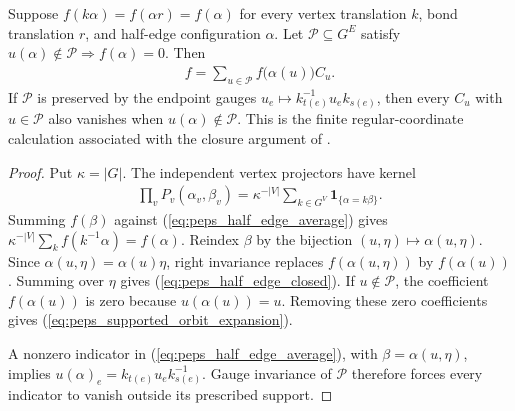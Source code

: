 \begin{lemma}%
    \label{thm:peps_regular_invariant_state_span}
    \leanok
    Suppose $f(k\alpha)=f(\alpha r)=f(\alpha)$ for every vertex
    translation $k$, bond translation $r$, and half-edge configuration
    $\alpha$. Let $\mathcal P\subseteq G^E$ satisfy
    $u(\alpha)\notin\mathcal P\Rightarrow f(\alpha)=0$. Then
    \begin{align}
        f=\sum_{u\in\mathcal P} f\bigl(\alpha(u)\bigr)C_u.
        \label{eq:peps_supported_orbit_expansion}
    \end{align}
    If $\mathcal P$ is preserved by the endpoint gauges
    $u_e\mapsto k_{t(e)}^{-1}u_ek_{s(e)}$, then every $C_u$ with
    $u\in\mathcal P$ also vanishes when $u(\alpha)\notin\mathcal P$.
    This is the finite regular-coordinate calculation associated with
    the closure argument of \cite[Theorem~5.5]{Schuch2010PEPS}.
\end{lemma}

\begin{proof}\leanok
    Put $\kappa=|G|$. The independent vertex projectors have kernel
    \begin{align}
        \prod_vP_v(\alpha_v,\beta_v)
        =\kappa^{-|V|}\sum_{k\in G^V}
        \mathbf1_{\{\alpha=k\beta\}}.
        \label{eq:peps_half_edge_average}
    \end{align}
    Summing $f(\beta)$ against (\ref{eq:peps_half_edge_average}) gives
    $\kappa^{-|V|}\sum_k f(k^{-1}\alpha)=f(\alpha)$.
    Reindex $\beta$ by the bijection $(u,\eta)\mapsto\alpha(u,\eta)$.
    Since $\alpha(u,\eta)=\alpha(u)\eta$, right invariance replaces
    $f(\alpha(u,\eta))$ by $f(\alpha(u))$. Summing over $\eta$ gives
    (\ref{eq:peps_half_edge_closed}). If $u\notin\mathcal P$,
    the coefficient $f(\alpha(u))$ is zero because
    $u(\alpha(u))=u$. Removing these zero coefficients gives
    (\ref{eq:peps_supported_orbit_expansion}).

    A nonzero indicator in (\ref{eq:peps_half_edge_average}), with
    $\beta=\alpha(u,\eta)$, implies
    $u(\alpha)_e=k_{t(e)}u_ek_{s(e)}^{-1}$.
    Gauge invariance of $\mathcal P$ therefore forces every indicator
    to vanish outside its prescribed support.
\end{proof}

